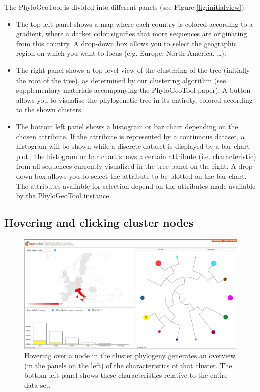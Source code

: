 \documentclass[a4paper, 11pt]{article} %
\begin{document}
The PhyloGeoTool is divided into different panels (see Figure \ref{fig:initialview}): 
\begin{itemize}
  \item The top left panel shows a map where each country is colored according to a gradient, where a darker color signifies that more sequences are originating from this country. 
    A drop-down box allows you to select the geographic region on which you want to focus (e.g. Europe, North America, \ldots).
  \item The right panel shows a top-level view of the clustering of the tree (initially the root of the tree), as determined by our clustering algorithm (see supplementary materials accompanying the PhyloGeoTool paper).
  A button allows you to visualise the phylogenetic tree in its entirety, colored according to the shown clusters.
  \item The bottom left panel shows a histogram or bar chart depending on the chosen attribute. If the attribute is represented by a continuous dataset, a histogram will be shown while a discrete dataset is displayed by a bar chart plot.
  The histogram or bar chart shows a certain attribute (i.e. characteristic) from all sequences currently visualized in the tree panel on the right. 
  A drop-down box allows you to select the attribute to be plotted on the bar chart. 
  The attributes available for selection depend on the attributes made available by the PhyloGeoTool instance.
\end{itemize}


\subsection{Hovering and clicking cluster nodes}
\begin{figure}[H]
\centering
\includegraphics[scale=0.1875]{images/hover_node.PNG}
\vspace{-0.75cm}
\caption{Hovering over a node in the cluster phylogeny generates an overview (in the panels on the left) of the characteristics of that cluster. The bottom left panel shows these characteristics relative to the entire data set.}
\label{fig:hovernode}
\end{figure}
\end{document}
